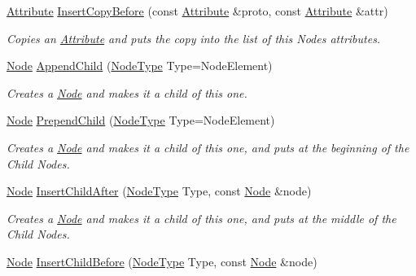 \begin{DoxyCompactItemize}
\hyperlink{classphys_1_1xml_1_1Attribute}{Attribute} \hyperlink{classphys_1_1xml_1_1Node_a1491dda93107e3b3ea095e717698e587}{InsertCopyBefore} (const \hyperlink{classphys_1_1xml_1_1Attribute}{Attribute} \&proto, const \hyperlink{classphys_1_1xml_1_1Attribute}{Attribute} \&attr)
\begin{DoxyCompactList}\small\item\em Copies an \hyperlink{classphys_1_1xml_1_1Attribute}{Attribute} and puts the copy into the list of this Nodes attributes. \item\end{DoxyCompactList}\item 
\hyperlink{classphys_1_1xml_1_1Node}{Node} \hyperlink{classphys_1_1xml_1_1Node_a4971850b72467fcdcf1b3beeb09f26cf}{AppendChild} (\hyperlink{namespacephys_1_1xml_a668b0cc666a9d49f7c7222a7552115d3}{NodeType} Type=NodeElement)
\begin{DoxyCompactList}\small\item\em Creates a \hyperlink{classphys_1_1xml_1_1Node}{Node} and makes it a child of this one. \item\end{DoxyCompactList}\item 
\hyperlink{classphys_1_1xml_1_1Node}{Node} \hyperlink{classphys_1_1xml_1_1Node_a959da20ad42a837b64889008247a5c21}{PrependChild} (\hyperlink{namespacephys_1_1xml_a668b0cc666a9d49f7c7222a7552115d3}{NodeType} Type=NodeElement)
\begin{DoxyCompactList}\small\item\em Creates a \hyperlink{classphys_1_1xml_1_1Node}{Node} and makes it a child of this one, and puts at the beginning of the Child Nodes. \item\end{DoxyCompactList}\item 
\hyperlink{classphys_1_1xml_1_1Node}{Node} \hyperlink{classphys_1_1xml_1_1Node_affc4d9cc0ea7c89bac58d91a432af2ef}{InsertChildAfter} (\hyperlink{namespacephys_1_1xml_a668b0cc666a9d49f7c7222a7552115d3}{NodeType} Type, const \hyperlink{classphys_1_1xml_1_1Node}{Node} \&node)
\begin{DoxyCompactList}\small\item\em Creates a \hyperlink{classphys_1_1xml_1_1Node}{Node} and makes it a child of this one, and puts at the middle of the Child Nodes. \item\end{DoxyCompactList}\item 
\hyperlink{classphys_1_1xml_1_1Node}{Node} \hyperlink{classphys_1_1xml_1_1Node_a11be362cee3fc88c276076c8642189ab}{InsertChildBefore} (\hyperlink{namespacephys_1_1xml_a668b0cc666a9d49f7c7222a7552115d3}{NodeType} Type, const \hyperlink{classphys_1_1xml_1_1Node}{Node} \&node)

\end{DoxyCompactItemize}
